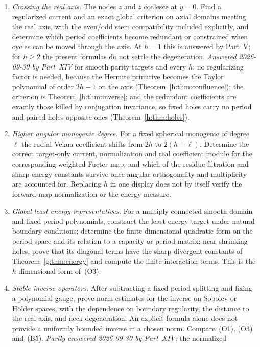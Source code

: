 \documentclass[11pt,a4paper]{article}
\numberwithin{equation}{section}
\theoremstyle{definition}
\theoremstyle{remark}
\theoremstyle{plain}
\begin{document}
\begin{enumerate}[label=\textup{(Q\arabic*)}]
\item \emph{Crossing the real axis.} The nodes $z$ and $\bar z$ coalesce at
$y=0$. Find a regularized current and an exact global criterion on axial
domains meeting the real axis, with the even/odd stem compatibility included
explicitly, and determine which period coefficients become redundant or
constrained when cycles can be moved through the axis. At $h=1$ this is
answered by Part~V; for $h\ge2$ the present formulas do not settle the
degeneration. \emph{Answered 2026-09-30 by Part~XIV} for smooth parity targets
and every $h$: no regularizing factor is needed, because the Hermite primitive
becomes the Taylor polynomial of order $2h-1$ on the axis
(Theorem~\ref{h:thm:confluence}); the criterion is
Theorem~\ref{h:thm:inverse}; and the redundant coefficients are exactly those
killed by conjugation invariance, so fixed holes carry no period and paired
holes opposite ones (Theorem~\ref{h:thm:holes}).
\item \emph{Higher angular monogenic degree.} For a fixed spherical monogenic
of degree $\ell$ the radial Vekua coefficient shifts from $2h$ to $2(h+\ell)$.
Determine the correct target-only current, normalization and real
coefficient module for the corresponding weighted Fueter map, and which of
the residue filtration and sharp energy constants survive once angular
orthogonality and multiplicity are accounted for. Replacing $h$ in one
display does not by itself verify the forward-map normalization or the
energy measure.
\item \emph{Global least-energy representatives.} For a multiply connected
smooth domain and fixed period polynomials, construct the least-energy target
under natural boundary conditions; determine the finite-dimensional quadratic
form on the period space and its relation to a capacity or period matrix;
near shrinking holes, prove that its diagonal terms have the sharp divergent
constants of Theorem~\ref{g:thm:energy} and compute the finite interaction
terms. This is the $h$-dimensional form of~(O3).
\item \emph{Stable inverse operators.} After subtracting a fixed period
splitting and fixing a polynomial gauge, prove norm estimates for the inverse
on Sobolev or H\"older spaces, with the dependence on boundary regularity, the
distance to the real axis, and neck degeneration. An explicit formula alone
does not provide a uniformly bounded inverse in a chosen norm. Compare~(O1),
(O3) and~(B5). \emph{Partly answered 2026-09-30 by Part~XIV:} the normalized

\end{enumerate}
\end{document}
